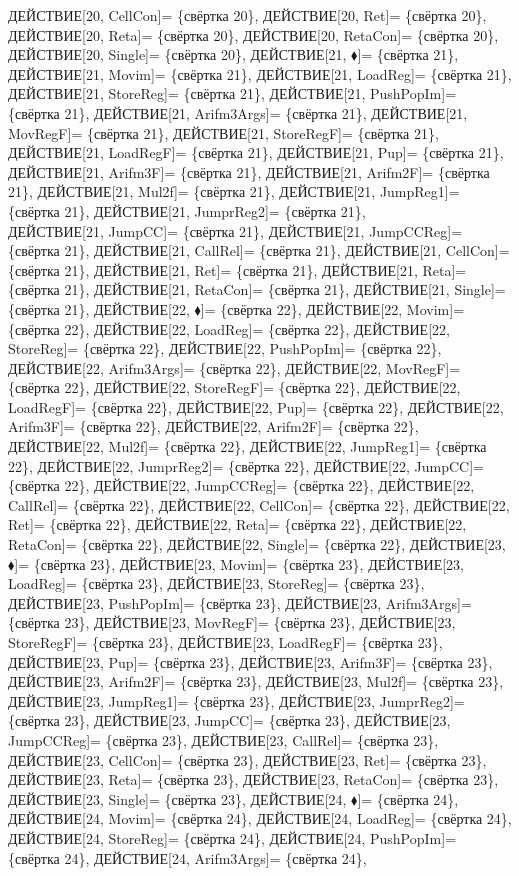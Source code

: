 \documentclass[a0]{a0poster}
\begin{document}
ДЕЙСТВИЕ[20, CellCon]= \{свёртка 20\}, ДЕЙСТВИЕ[20, Ret]= \{свёртка 20\}, ДЕЙСТВИЕ[20, Reta]= \{свёртка 20\}, ДЕЙСТВИЕ[20, RetaCon]= \{свёртка 20\}, ДЕЙСТВИЕ[20, Single]= \{свёртка 20\}, ДЕЙСТВИЕ[21, $\blacklozenge$]= \{свёртка 21\}, ДЕЙСТВИЕ[21, Movim]= \{свёртка 21\}, ДЕЙСТВИЕ[21, LoadReg]= \{свёртка 21\}, ДЕЙСТВИЕ[21, StoreReg]= \{свёртка 21\}, ДЕЙСТВИЕ[21, PushPopIm]= \{свёртка 21\}, ДЕЙСТВИЕ[21, Arifm3Args]= \{свёртка 21\}, ДЕЙСТВИЕ[21, MovRegF]= \{свёртка 21\}, ДЕЙСТВИЕ[21, StoreRegF]= \{свёртка 21\}, ДЕЙСТВИЕ[21, LoadRegF]= \{свёртка 21\}, ДЕЙСТВИЕ[21, Pup]= \{свёртка 21\}, ДЕЙСТВИЕ[21, Arifm3F]= \{свёртка 21\}, ДЕЙСТВИЕ[21, Arifm2F]= \{свёртка 21\}, ДЕЙСТВИЕ[21, Mul2f]= \{свёртка 21\}, ДЕЙСТВИЕ[21, JumpReg1]= \{свёртка 21\}, ДЕЙСТВИЕ[21, JumprReg2]= \{свёртка 21\}, \\
ДЕЙСТВИЕ[21, JumpCC]= \{свёртка 21\}, ДЕЙСТВИЕ[21, JumpCCReg]= \{свёртка 21\}, ДЕЙСТВИЕ[21, CallRel]= \{свёртка 21\}, ДЕЙСТВИЕ[21, CellCon]= \{свёртка 21\}, ДЕЙСТВИЕ[21, Ret]= \{свёртка 21\}, ДЕЙСТВИЕ[21, Reta]= \{свёртка 21\}, ДЕЙСТВИЕ[21, RetaCon]= \{свёртка 21\}, ДЕЙСТВИЕ[21, Single]= \{свёртка 21\}, ДЕЙСТВИЕ[22, $\blacklozenge$]= \{свёртка 22\}, ДЕЙСТВИЕ[22, Movim]= \{свёртка 22\}, ДЕЙСТВИЕ[22, LoadReg]= \{свёртка 22\}, ДЕЙСТВИЕ[22, StoreReg]= \{свёртка 22\}, ДЕЙСТВИЕ[22, PushPopIm]= \{свёртка 22\}, ДЕЙСТВИЕ[22, Arifm3Args]= \{свёртка 22\}, ДЕЙСТВИЕ[22, MovRegF]= \{свёртка 22\}, ДЕЙСТВИЕ[22, StoreRegF]= \{свёртка 22\}, ДЕЙСТВИЕ[22, LoadRegF]= \{свёртка 22\}, ДЕЙСТВИЕ[22, Pup]= \{свёртка 22\}, ДЕЙСТВИЕ[22, Arifm3F]= \{свёртка 22\}, ДЕЙСТВИЕ[22, Arifm2F]= \{свёртка 22\}, \\
ДЕЙСТВИЕ[22, Mul2f]= \{свёртка 22\}, ДЕЙСТВИЕ[22, JumpReg1]= \{свёртка 22\}, ДЕЙСТВИЕ[22, JumprReg2]= \{свёртка 22\}, ДЕЙСТВИЕ[22, JumpCC]= \{свёртка 22\}, ДЕЙСТВИЕ[22, JumpCCReg]= \{свёртка 22\}, ДЕЙСТВИЕ[22, CallRel]= \{свёртка 22\}, ДЕЙСТВИЕ[22, CellCon]= \{свёртка 22\}, ДЕЙСТВИЕ[22, Ret]= \{свёртка 22\}, ДЕЙСТВИЕ[22, Reta]= \{свёртка 22\}, ДЕЙСТВИЕ[22, RetaCon]= \{свёртка 22\}, ДЕЙСТВИЕ[22, Single]= \{свёртка 22\}, ДЕЙСТВИЕ[23, $\blacklozenge$]= \{свёртка 23\}, ДЕЙСТВИЕ[23, Movim]= \{свёртка 23\}, ДЕЙСТВИЕ[23, LoadReg]= \{свёртка 23\}, ДЕЙСТВИЕ[23, StoreReg]= \{свёртка 23\}, ДЕЙСТВИЕ[23, PushPopIm]= \{свёртка 23\}, ДЕЙСТВИЕ[23, Arifm3Args]= \{свёртка 23\}, ДЕЙСТВИЕ[23, MovRegF]= \{свёртка 23\}, ДЕЙСТВИЕ[23, StoreRegF]= \{свёртка 23\}, ДЕЙСТВИЕ[23, LoadRegF]= \{свёртка 23\}, \\
ДЕЙСТВИЕ[23, Pup]= \{свёртка 23\}, ДЕЙСТВИЕ[23, Arifm3F]= \{свёртка 23\}, ДЕЙСТВИЕ[23, Arifm2F]= \{свёртка 23\}, ДЕЙСТВИЕ[23, Mul2f]= \{свёртка 23\}, ДЕЙСТВИЕ[23, JumpReg1]= \{свёртка 23\}, ДЕЙСТВИЕ[23, JumprReg2]= \{свёртка 23\}, ДЕЙСТВИЕ[23, JumpCC]= \{свёртка 23\}, ДЕЙСТВИЕ[23, JumpCCReg]= \{свёртка 23\}, ДЕЙСТВИЕ[23, CallRel]= \{свёртка 23\}, ДЕЙСТВИЕ[23, CellCon]= \{свёртка 23\}, ДЕЙСТВИЕ[23, Ret]= \{свёртка 23\}, ДЕЙСТВИЕ[23, Reta]= \{свёртка 23\}, ДЕЙСТВИЕ[23, RetaCon]= \{свёртка 23\}, ДЕЙСТВИЕ[23, Single]= \{свёртка 23\}, ДЕЙСТВИЕ[24, $\blacklozenge$]= \{свёртка 24\}, ДЕЙСТВИЕ[24, Movim]= \{свёртка 24\}, ДЕЙСТВИЕ[24, LoadReg]= \{свёртка 24\}, ДЕЙСТВИЕ[24, StoreReg]= \{свёртка 24\}, ДЕЙСТВИЕ[24, PushPopIm]= \{свёртка 24\}, ДЕЙСТВИЕ[24, Arifm3Args]= \{свёртка 24\}, \\
\end{document}
